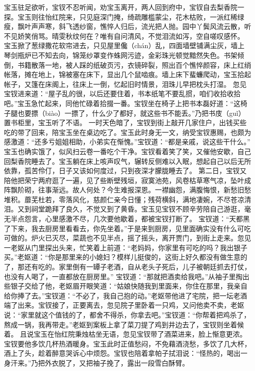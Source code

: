 \documentclass[12pt,oneside]{book}
\begin{document}
宝玉驻足欲听，宝钗不忍听闻，劝宝玉离开，两人回到府中，宝钗自去梨香院一探。宝玉则往怡红院来，只见庭深门掩，绮疏雕槛蒙尘，花木枯败，一派红稀绿瘦，飘叶声声寒，斜飞透纱窗，憔悴人归后，流光把人抛。园中丫鬓风流云散，听不见娇笑俏骂。晴雯秋纹何在？唯有自问清风，不觉泪流如泻，空自嗟叹感怀。
宝玉掀了葱绿撒花软帘进去，只见屋里儳（chán）乱，四面墙壁铺满尘灰，墙上琴剑瓶炉已不知去向，锦笼纱罩变作蛛网污迹，金彩珠光顿觉黯然失色。书架倾倒，书籍散落一地，被人踩的纸破页污，衣镜碎裂，照出百个憔悴颜容，床上红绡帐落，摊在地上，锦被塞在床下，显出几个鼠啮痕。墙上床下蜚蠊爬动，宝玉拾起帐子，又篷在床阁上，往床上一倒，忆起旧时情景，泪珠儿早把枕头打湿。
忽见宝钗进来道：“屋子乱的很，以后还要住着，书本纸笔不要乱掼，咱们收拾收拾吧。”宝玉急忙起来，同他忙碌着拾掇一番。宝钗坐在椅子上把书本磊好道：“这椅子腿也要摽（biào）一摽了，什么少了都好，就这些书不能丢。”乃把书庋（guǐ）置书柜里，宝玉听了不语。
一时天色暗了，宝钗到街上敲开几家住户，出钱买些吃的带了回来，陪宝玉坐在桌边吃了。宝玉此时身无一文，纳受宝钗惠赐，也颇为感激道：“还多亏姐姐相助，小弟实在惭愧。”宝钗道：“都是亲戚，说这些干什么。”
宝玉也确实饿了，似风扫云卷一番吃个干净。宝钗看着笑了笑，又催他安歇，自己回梨香院睡去了。宝玉躺在床上咳声叹气，辗转反侧难以入眠，想起自己以后无所依靠，孤苦伶仃，日子又该如何度过，只到夜深才朦胧睡去了。
第二日，宝钗又陪他把荣宁两府逛了一遍，见了些断壁残垣，寂寞池苑，风卷枯草寒气凉，坠叶成阵飘阶砌，往事渐远。故人何处？今生难报深恩。一襟幽怨，满腹悔恨，新愁旧愁堆积。蘼芜杜若，零落风化，慈颜仁亲今日懂；残荷横斜，满地凄婉，不尽苍凉清泪。又到祠堂跪拜了良久，不觉又到了黄昏。宝玉见宝钗不顾辛劳陪自己游逛，毫无半点怨言，心里感激不尽，几次要他歇着，都被宝钗打断了。
宝钗道：“天都黑了下来，我去厨房里看看去，你先坐着。”于是来到厨房，见里面确实没有什么可吃可做的。炉火已灭尽，菜蔬也不见半点，摇了摇头，离开贾门，到街上走来。忽见一老妪从门里探出头来，忙笑着上前道：“老妈妈，你家里有可吃的吗？我出银子买。”老妪道：“你是那里来的小媳妇？模样儿挺俊的，这街上好久都没有做生意的了，那还有吃的。家里倒有一罈子老酒，自从老头子死后，儿子被朝廷抓去打仗，也没有人喝了，一直都放在厨房里。”
宝钗道：“那就把酒卖给我吧。”从袖子里掏出些银子交给了他，老妪眉开眼笑道：“姑娘快随我到里面来，你住在那里，我亲自给你捧了去。”宝钗道：“不必了，我自己抱的动。”老妪带他进了宅院，把一坛老酒端了出来。宝钗接了，正要离去，忽见院子里卧着一只鸡，又问他卖不卖，老妪说：“家里就这个值钱的了，都舍不得杀，你拿去吧。”宝钗道：“你帮着把鸡杀了，熬成一锅，我再带走。”老妪到案板上拿了菜刀提了鸡到井边去了，宝钗则坐着候着。
且说宝玉在怡红院秉烛枯坐无语，忽见宝钗带了酒菜进来，脸上惭意更浓。宝钗要他多饮几杯热酒暖身。宝玉此时正值愁闷，不免藉酒浇愁，多饮了几大杯，酒上了头，趁着醉意哭诉心中烦怨。宝钗也陪着拿帕子拭泪说：“怪热的，喝出一身汗来。”乃把外衣脱了，又把袖子挽了，露出一段雪白酥臂。
\end{document}
